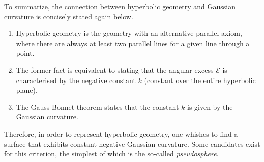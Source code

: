 To summarize, the connection between hyperbolic geometry and Gaussian curvature is concisely stated again below.
\begin{enumerate}
    \item Hyperbolic geometry is the geometry with an alternative parallel axiom, where there are always at least two parallel lines for a given line through a point.
    \item The former fact is equivalent to stating that the angular excess \(\mathscr{E}\) is characterised by the negative constant \(k\) (constant over the entire hyperbolic plane).
    \item The Gauss-Bonnet theorem states that the constant \(k\) is given by the Gaussian curvature.
\end{enumerate}
Therefore, in order to represent hyperbolic geometry, one whishes to find a surface that exhibits constant negative Gaussian curvature. Some candidates exist for this criterion, the simplest of which is the so-called \emph{pseudosphere}.

